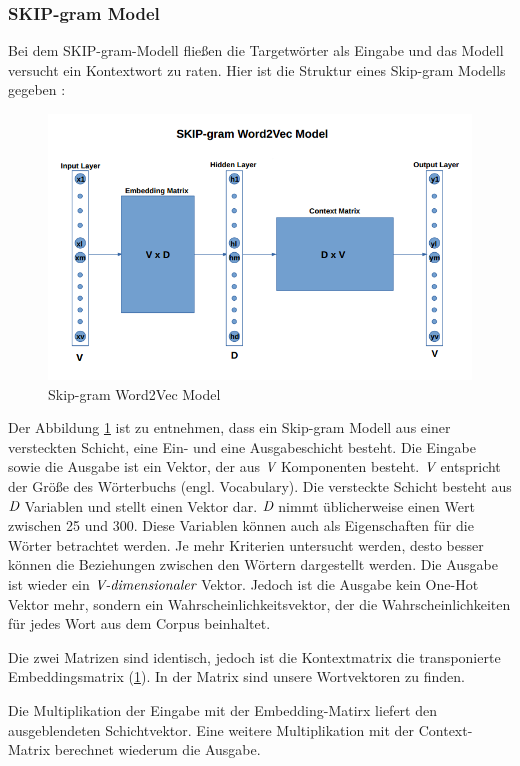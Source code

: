 \subsubsection{SKIP-gram Model}
Bei dem SKIP-gram-Modell fließen die Targetwörter als Eingabe und das Modell versucht ein Kontextwort zu raten. Hier ist die Struktur eines Skip-gram Modells gegeben \cite{Ali:19}:

\begin{figure}[H]
	\centering
	\includegraphics[scale=0.6]{images/SKIP_Model.png}
	\caption{Skip-gram Word2Vec Model}
	\label{skip}
\end{figure}

Der Abbildung \ref{skip} ist zu entnehmen, dass ein Skip-gram Modell aus einer versteckten Schicht, eine Ein- und eine Ausgabeschicht besteht. Die Eingabe sowie die Ausgabe ist ein Vektor, der aus $\emph{V}$ Komponenten besteht. $\emph{V}$ entspricht der Größe des Wörterbuchs (engl. Vocabulary). Die versteckte Schicht besteht aus $\emph{D}$ Variablen und stellt einen Vektor dar. $\emph{D}$ nimmt üblicherweise einen Wert zwischen 25 und 300. Diese Variablen können auch als Eigenschaften für die Wörter betrachtet werden. Je mehr Kriterien untersucht werden, desto besser können die Beziehungen zwischen den Wörtern dargestellt werden. Die Ausgabe ist wieder ein $\emph{V-dimensionaler}$ Vektor. Jedoch ist die Ausgabe kein One-Hot Vektor mehr, sondern ein Wahrscheinlichkeitsvektor, der die Wahrscheinlichkeiten für jedes Wort aus dem Corpus beinhaltet.

Die zwei Matrizen sind identisch, jedoch ist die Kontextmatrix die transponierte Embeddingsmatrix (\cref{skip}). In der Matrix sind unsere Wortvektoren zu finden.

Die Multiplikation der Eingabe mit der Embedding-Matirx liefert den ausgeblendeten Schichtvektor. Eine weitere Multiplikation mit der Context-Matrix berechnet wiederum die Ausgabe.

